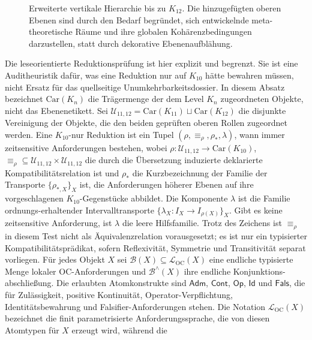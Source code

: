 \begin{figure}[htbp]
\centering

\caption{Erweiterte vertikale Hierarchie bis zu \(K_{12}\). Die hinzugefügten oberen Ebenen sind durch den
Bedarf begründet, sich entwickelnde meta-theoretische Räume und ihre globalen Kohärenzbedingungen darzustellen,
statt durch dekorative Ebenenaufblähung.}
\label{fig:oc13-levels-k12}
\end{figure}

Die leseorientierte Reduktionsprüfung ist hier explizit und begrenzt. Sie ist eine Auditheuristik dafür,
was eine Reduktion nur auf \(K_{10}\) hätte bewahren müssen, nicht Ersatz für das quellseitige
Unumkehrbarkeitsdossier. In diesem Absatz bezeichnet \(\mathrm{Car}(K_n)\) die Trägermenge der dem Level
\(K_n\) zugeordneten Objekte, nicht das Ebenenetikett. Sei
\(\mathcal{U}_{11,12}=\mathrm{Car}(K_{11})\sqcup \mathrm{Car}(K_{12})\) die disjunkte Vereinigung der
Objekte, die den beiden geprüften oberen Rollen zugeordnet werden. Eine \(K_{10}\)-nur Reduktion ist ein
Tupel \((\rho,\equiv_{\rho},\rho_{\ast},\lambda)\), wann immer zeitsensitive Anforderungen bestehen, wobei
\(\rho:\mathcal{U}_{11,12}\to \mathrm{Car}(K_{10})\),
\(\equiv_{\rho}\subseteq\mathcal{U}_{11,12}\times\mathcal{U}_{11,12}\) die durch die Übersetzung induzierte
deklarierte Kompatibilitätsrelation ist und \(\rho_{\ast}\) die Kurzbezeichnung der Familie der Transporte
\(\{\rho_{\ast,X}\}_X\) ist, die Anforderungen höherer Ebenen auf ihre vorgeschlagenen
\(K_{10}\)-Gegenstücke abbildet. Die Komponente \(\lambda\) ist die Familie ordnungs-erhaltender
Intervalltransporte \(\{\lambda_X:I_X\to I_{\rho(X)}\}_X\). Gibt es keine zeitsensitive Anforderung,
ist \(\lambda\) die leere Hilfsfamilie. Trotz des Zeichens ist \(\equiv_{\rho}\) in diesem Test nicht als Äquivalenzrelation
vorausgesetzt; es ist nur ein typisierter Kompatibilitätsprädikat, sofern Reflexivität, Symmetrie und
Transitivität separat vorliegen. Für jedes Objekt \(X\) sei \(\mathcal{B}(X)\subseteq\mathcal{L}_{\mathrm{OC}}(X)\)
eine endliche typisierte Menge lokaler OC-Anforderungen und \(\mathcal{B}^{\wedge}(X)\) ihre endliche Konjunktions-
abschließung. Die erlaubten Atomkonstrukte sind \(\mathsf{Adm}\), \(\mathsf{Cont}\), \(\mathsf{Op}\),
\(\mathsf{Id}\) und \(\mathsf{Fals}\), die für Zulässigkeit, positive Kontinuität, Operator-Verpflichtung,
Identitätsbewahrung und Falsifier-Anforderungen stehen. Die Notation \(\mathcal{L}_{\mathrm{OC}}(X)\) bezeichnet
die finit parametrisierte Anforderungssprache, die von diesen Atomtypen für \(X\) erzeugt wird, während die
